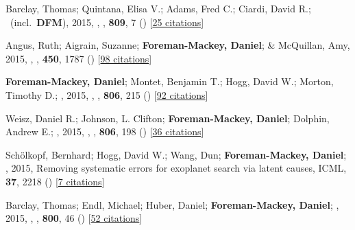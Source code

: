 \item[{\color{numcolor}\scriptsize12}] Barclay, Thomas; Quintana, Elisa V.; Adams, Fred C.; Ciardi, David R.; \etal\ (incl.\ \textbf{DFM}), 2015, , \apj, \textbf{809}, 7 () [\href{https://ui.adsabs.harvard.edu/abs/2015ApJ...809....7B}{25 citations}]

\item[{\color{numcolor}\scriptsize11}] Angus, Ruth; Aigrain, Suzanne; \textbf{Foreman-Mackey, Daniel}; \& McQuillan, Amy, 2015, , \mnras, \textbf{450}, 1787 () [\href{https://ui.adsabs.harvard.edu/abs/2015MNRAS.450.1787A}{98 citations}]

\item[{\color{numcolor}\scriptsize10}] \textbf{Foreman-Mackey, Daniel}; Montet, Benjamin T.; Hogg, David W.; Morton, Timothy D.; \etal, 2015, , \apj, \textbf{806}, 215 () [\href{https://ui.adsabs.harvard.edu/abs/2015ApJ...806..215F}{92 citations}]

\item[{\color{numcolor}\scriptsize9}] Weisz, Daniel R.; Johnson, L. Clifton; \textbf{Foreman-Mackey, Daniel}; Dolphin, Andrew E.; \etal, 2015, , \apj, \textbf{806}, 198 () [\href{https://ui.adsabs.harvard.edu/abs/2015ApJ...806..198W}{36 citations}]

\item[{\color{numcolor}\scriptsize8}] Sch{\"o}lkopf, Bernhard; Hogg, David W.; Wang, Dun; \textbf{Foreman-Mackey, Daniel}; \etal, 2015, Removing systematic errors for exoplanet search via latent causes, ICML, \textbf{37}, 2218 () [\href{https://scholar.google.com/scholar?cites=11768165421845046384}{7 citations}]

\item[{\color{numcolor}\scriptsize7}] Barclay, Thomas; Endl, Michael; Huber, Daniel; \textbf{Foreman-Mackey, Daniel}; \etal, 2015, , \apj, \textbf{800}, 46 () [\href{https://ui.adsabs.harvard.edu/abs/2015ApJ...800...46B}{52 citations}]

